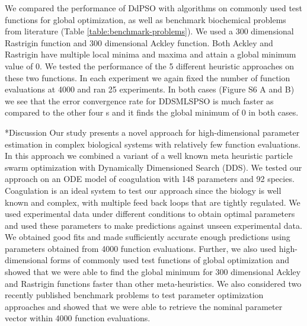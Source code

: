 \documentclass[12pt]{article}
\makeatletter
\renewcommand\section{\@startsection
	{subsection}{2}{0mm}
	{-0.2in}
	{0.05\baselineskip}
	{\normalfont\large\bfseries}}
\makeatother
\begin{document}
We compared the performance of DdPSO with algorithms on commonly used test functions for global optimization, as well as benchmark biochemical problems from literature (Table \ref{table:benchmark-problems}). We used a 300 dimensional Rastrigin function and 300 dimensional Ackley function. Both Ackley and Rastrigin have multiple local minima and maxima and attain a global minimum value of 0. We tested the performance of the 5 different heuristic approaches on these two functions. In each experiment we again fixed the number of function evaluations at 4000 and ran 25 experiments. In both cases (Figure S6 A and B) we see that the error convergence rate for DDSMLSPSO is much faster as compared to the other four s and it finds the global minimum of 0 in both cases.



\clearpage
\section*{Discussion}
Our study presents a novel approach for high-dimensional parameter estimation in complex biological systems with relatively few function evaluations. In this approach we combined a variant of a well known meta heuristic particle swarm optimization with Dynamically Dimensioned Search (DDS). We tested our approach on an ODE model of coagulation with 148 parameters and 92 species. Coagulation is an ideal system to test our approach since the biology is well known and complex, with multiple feed back loops that are tightly regulated. We used experimental data under different conditions to obtain optimal parameters and used these parameters to make predictions against unseen experimental data. We obtained good fits and made sufficiently accurate enough predictions using parameters obtained from 4000 function evaluations. Further, we also used high-dimensional forms of commonly used test functions of global optimization and showed that we were able to find the global minimum for 300 dimensional Ackley and Rastrigin functions faster than other meta-heuristics. We also considered two recently published benchmark problems to test parameter optimization approaches and showed that we were able to retrieve the nominal parameter vector within 4000 function evaluations.
\end{document}
